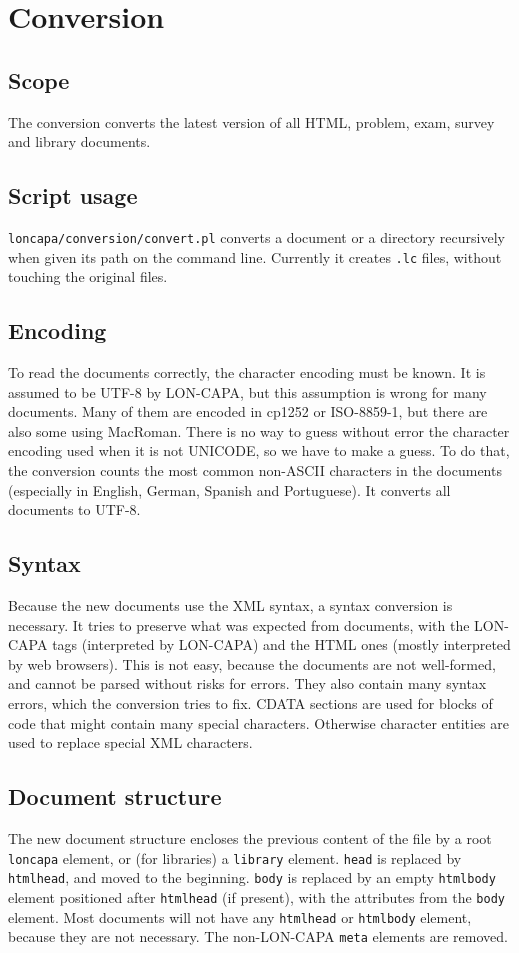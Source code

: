 \chapter{Conversion}

\section{Scope}
The conversion converts the latest version of all HTML, problem, exam, survey and library documents.

\section{Script usage}
\texttt{loncapa/conversion/convert.pl} converts a document or a directory recursively when given its path on the command line. Currently it creates \texttt{.lc} files, without touching the original files.

\section{Encoding}
To read the documents correctly, the character encoding must be known. It is assumed to be UTF-8 by LON-CAPA, but this assumption is wrong for many documents. Many of them are encoded in cp1252 or ISO-8859-1, but there are also some using MacRoman. There is no way to guess without error the character encoding used when it is not UNICODE, so we have to make a guess. To do that, the conversion counts the most common non-ASCII characters in the documents (especially in English, German, Spanish and Portuguese). It converts all documents to UTF-8.

\section{Syntax}
Because the new documents use the XML syntax, a syntax conversion is necessary. It tries to preserve what was expected from documents, with the LON-CAPA tags (interpreted by LON-CAPA) and the HTML ones (mostly interpreted by web browsers). This is not easy, because the documents are not well-formed, and cannot be parsed without risks for errors. They also contain many syntax errors, which the conversion tries to fix. CDATA sections are used for blocks of code that might contain many special characters. Otherwise character entities are used to replace special XML characters.

\section{Document structure}
The new document structure encloses the previous content of the file by a root \texttt{loncapa} element, or (for libraries) a \texttt{library} element.
\texttt{head} is replaced by \texttt{htmlhead}, and moved to the beginning.
\texttt{body} is replaced by an empty \texttt{htmlbody} element positioned after \texttt{htmlhead} (if present), with the attributes from the \texttt{body} element.
Most documents will not have any \texttt{htmlhead} or \texttt{htmlbody} element, because they are not necessary.
The non-LON-CAPA \texttt{meta} elements are removed.

